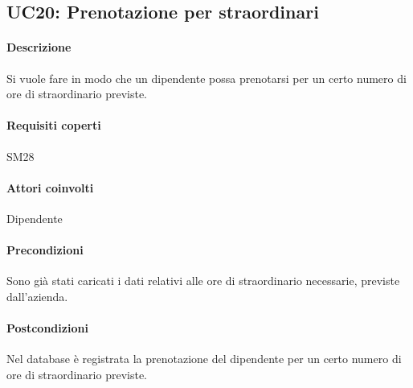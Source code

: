 \subsection{UC20: Prenotazione per straordinari}
\paragraph{Descrizione}
Si vuole fare in modo che un dipendente possa prenotarsi per un certo numero di ore di straordinario previste.
\paragraph{Requisiti coperti}
SM28
\paragraph{Attori coinvolti}
Dipendente
\paragraph{Precondizioni}
Sono già stati caricati i dati relativi alle ore di straordinario necessarie, previste dall'azienda.
\paragraph{Postcondizioni}
Nel database è registrata la prenotazione del dipendente per un certo numero di ore di straordinario previste.
